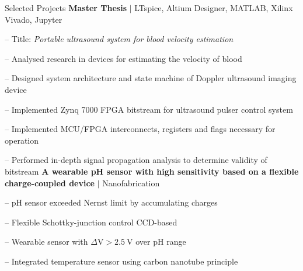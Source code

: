 
\begin{rubric}{\faTasks[solid]  Selected Projects}
\entry*[2023][]%
	\textbf{Master Thesis} $|$ LTspice, Altium Designer, MATLAB, Xilinx Vivado, Jupyter \par
	-- Title: \emph{Portable ultrasound system for blood velocity estimation} \par
	-- Analysed research in devices for estimating the velocity of blood \par
	-- Designed system architecture and state machine of Doppler ultrasound imaging device \par
	-- Implemented Zynq 7000 FPGA bitstream for ultrasound pulser control system \par
	-- Implemented MCU/FPGA interconnects, registers and flags necessary for operation \par
	-- Performed in-depth signal propagation analysis to determine validity of bitstream
%
\entry*[2023][] \textbf{A wearable pH sensor with high sensitivity based on a flexible charge-coupled device} $|$ Nanofabrication \par
	-- pH sensor exceeded Nernst limit by accumulating charges \par
	-- Flexible Schottky-junction control CCD-based \par
	-- Wearable sensor with $\Delta \si{\volt}>\SI{2.5}{\volt}$ over pH range \par
	-- Integrated temperature sensor using carbon nanotube principle


\end{rubric}
